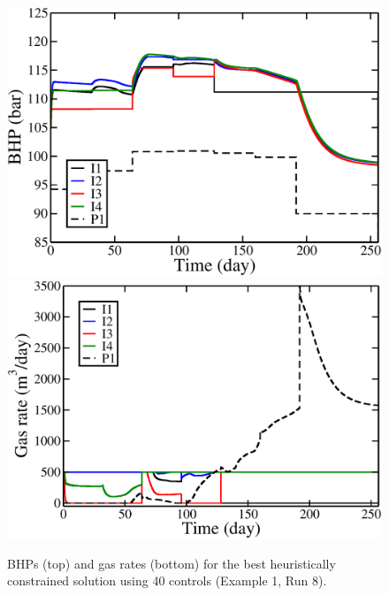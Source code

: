 \documentclass[twocolumn,numbook]{svjour3}          %
\begin{document}
\begin{figure}
\begin{center}
\includegraphics[totalheight=2.2in,angle=0]{HeuristicC500Steps8OptimalItPm_BHP.pdf}
\includegraphics[totalheight=2.17in,angle=0]{HeuristicC500Steps8OptimalItPm_rate_gas.pdf}
\end{center}
\caption{BHPs (top) and gas rates (bottom) for the best heuristically constrained solution using 40 controls (Example 1, Run 8).}
\label{fig:PIHeuristicControls40Plots}
\end{figure}
\end{document}
